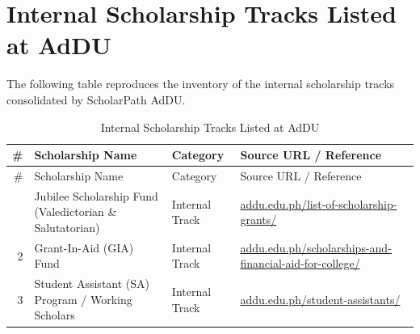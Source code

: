 \chapter{Internal Scholarship Tracks Listed at AdDU}
\label{app:pipelines}

The following table reproduces the inventory of the internal scholarship tracks consolidated by ScholarPath AdDU.

\begin{longtable}{@{}r p{5.6cm} l >{\raggedright\arraybackslash}p{5.6cm}@{}}
\caption{Internal Scholarship Tracks Listed at AdDU}\label{tab:appendix-a}\\
\toprule
\# & Scholarship Name & Category & Source URL / Reference \\
\midrule
\endfirsthead
\toprule
\# & Scholarship Name & Category & Source URL / Reference \\
\midrule
\endhead
\bottomrule
\endfoot
1 & Jubilee Scholarship Fund (Valedictorian \& Salutatorian) & Internal Track & \href{https://www.addu.edu.ph/list-of-scholarship-grants/}{addu.edu.ph/list-of-scholarship-grants/} \\
2 & Grant-In-Aid (GIA) Fund & Internal Track & \href{https://www.addu.edu.ph/scholarships-and-financial-aid-for-college/}{addu.edu.ph/scholarships-and-financial-aid-for-college/} \\
3 & Student Assistant (SA) Program / Working Scholars & Internal Track & \href{https://www.addu.edu.ph/student-assistants/}{addu.edu.ph/student-assistants/} \\
\end{longtable}
